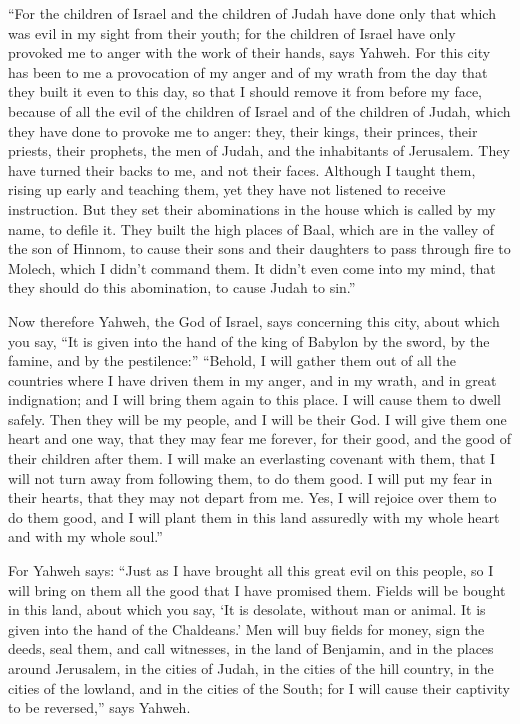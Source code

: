 {\par }{\PP {}“For the children of Israel and the children of Judah have done only that which was evil in my sight from their youth; for the children of Israel have only provoked me to anger with the work of their hands, says Yahweh.
For this city has been to me a provocation of my anger and of my wrath from the day that they built it even to this day, so that I should remove it from before my face,
because of all the evil of the children of Israel and of the children of Judah, which they have done to provoke me to anger: they, their kings, their princes, their priests, their prophets, the men of Judah, and the inhabitants of Jerusalem.
They have turned their backs to me, and not their faces. Although I taught them, rising up early and teaching them, yet they have not listened to receive instruction.
But they set their abominations in the house which is called by my name, to defile it.
They built the high places of Baal, which are in the valley of the son of Hinnom, to cause their sons and their daughters to pass through fire to Molech, which I didn’t command them. It didn’t even come into my mind, that they should do this abomination, to cause Judah to sin.”
\par }{\PP {}Now therefore Yahweh, the God of Israel, says concerning this city, about which you say, “It is given into the hand of the king of Babylon by the sword, by the famine, and by the pestilence:”
“Behold, I will gather them out of all the countries where I have driven them in my anger, and in my wrath, and in great indignation; and I will bring them again to this place. I will cause them to dwell safely.
Then they will be my people, and I will be their God.
I will give them one heart and one way, that they may fear me forever, for their good, and the good of their children after them.
I will make an everlasting covenant with them, that I will not turn away from following them, to do them good. I will put my fear in their hearts, that they may not depart from me.
Yes, I will rejoice over them to do them good, and I will plant them in this land assuredly with my whole heart and with my whole soul.”
\par }{\PP {}For Yahweh says: “Just as I have brought all this great evil on this people, so I will bring on them all the good that I have promised them.
Fields will be bought in this land, about which you say, ‘It is desolate, without man or animal. It is given into the hand of the Chaldeans.’
Men will buy fields for money, sign the deeds, seal them, and call witnesses, in the land of Benjamin, and in the places around Jerusalem, in the cities of Judah, in the cities of the hill country, in the cities of the lowland, and in the cities of the South; for I will cause their captivity to be reversed,” says Yahweh.

}
